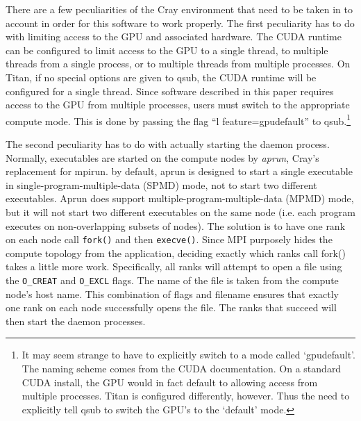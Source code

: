 There are a few peculiarities of the Cray environment that need to be taken in to account in order for this software to work properly.  The first peculiarity has to do with limiting access to the GPU and associated hardware.  The CUDA runtime can be configured to limit access to the GPU to a single thread, to multiple threads from a single process, or to multiple threads from multiple processes.  On Titan, if no special options are given to qsub, the CUDA runtime will be configured for a single thread.  Since software described in this paper requires access to the GPU from multiple processes, users must switch to the appropriate compute mode.  This is done by passing the flag ``l feature=gpudefault'' to qsub.\footnote{It may seem strange to have to explicitly switch to a mode called `gpudefault'.  The naming scheme comes from the CUDA documentation.  On a standard CUDA install, the GPU would in fact default to allowing access from multiple processes.  Titan is configured differently, however.  Thus the need to explicitly tell qsub to switch the GPU's to the `default' mode.}

The second peculiarity has to do with actually starting the daemon process.  Normally, executables are started on the compute nodes by \emph{aprun}, Cray's replacement for mpirun.  by default, aprun is designed to start a single executable in single-program-multiple-data (SPMD) mode, not to start two different executables.  Aprun does support multiple-program-multiple-data (MPMD) mode, but it will not start two different executables on the same node (i.e. each program executes on non-overlapping subsets of nodes).  The solution is to have one rank on each node call \texttt{fork()} and then \texttt{execve()}.  Since MPI purposely hides the compute topology from the application, deciding exactly which ranks call fork() takes a little more work.  Specifically, all ranks will attempt to open a file using the \texttt{O\_CREAT} and 
\texttt{O\_EXCL} flags.  The name of the file is taken from the compute node's host name.  This combination of flags and filename ensures that exactly one rank on each node successfully opens the file.  The ranks that succeed will then start the daemon processes.

